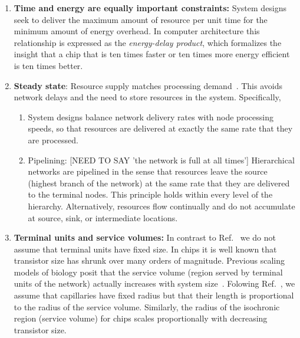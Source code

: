 \documentclass[12pt]{article}
\begin{document}
\begin{enumerate}
\item {\bf Time and energy are equally important constraints:} 
  System designs seek to deliver the maximum amount of
  resource per unit time for the minimum amount of energy overhead. 
  In computer architecture this relationship is expressed as the
  \emph{energy-delay product}, which formalizes the insight that a
  chip that is ten times faster or ten times more energy efficient is
  ten times better. 

\item {\bf Steady state}: Resource supply matches processing
  demand~\cite{banavar10}.  This avoids network delays and the need to
  store resources in the system. Specifically,
\begin{enumerate}
\item System designs balance network delivery rates with node
  processing speeds, so that resources are delivered at exactly the
  same rate that they are processed.

\item Pipelining: [NEED TO SAY 'the network is full at all times'] Hierarchical networks are pipelined in the sense
  that resources leave the source (highest branch of the network) at
  the same rate that they are delivered to the terminal nodes.  This
  principle holds within every level of the hierarchy.  Alternatively,
  resources flow continually and do not accumulate at source, sink, or
  intermediate locations.
\end{enumerate}

\item {\bf Terminal units and service volumes:} In contrast to Ref.~\cite{west97} we
  do not assume that terminal units have
  fixed size.   In chips it is well known that transistor size has
  shrunk over many orders of magnitude.   Previous scaling models of
  biology posit that the service volume (region served by terminal units of the network) actually increases with system
  size~\cite{west97,banavar10}.  Folowing Ref.~\cite{banavar10}, we assume that
  capillaries have fixed radius but that their length is proportional to the
  radius of the service volume.   Similarly, the radius of the isochronic region
  (service volume) for chips scales proportionally with decreasing
  transistor size.
\end{enumerate}
\end{document}
